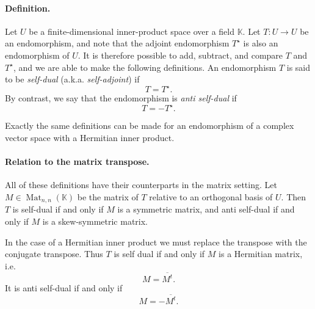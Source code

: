 \documentclass[12pt]{article}
\newcommand{\Mat}{\mathop{\mathrm{Mat}}\nolimits}
\newcommand{\kfield}{\mathbb{K}}
\newcommand{\adj}{^{\displaystyle \star}}
\begin{document}
\paragraph{Definition.}  Let $U$ be a finite-dimensional inner-product space
over a field $\kfield$.  Let $T:U\rightarrow U$ be an endomorphism,
and note that the adjoint endomorphism $T\adj$ is also an endomorphism
of $U$.  It is therefore possible to add, subtract, and compare $T$
and $T\adj$, and we are able to make the following definitions. An
endomorphism $T$ is said to be {\em self-dual} (a.k.a.  {\em
  self-adjoint}) if
$$T=T\adj.$$
By contrast, we say that the endomorphism is {\em anti self-dual} if 
$$T=-T\adj.$$

Exactly the same definitions can be made for an endomorphism of
a complex vector space with a Hermitian inner product.

\paragraph{Relation to the matrix transpose.} All of these definitions have
their counterparts in the matrix setting.  Let $M\in
\Mat_{n,n}(\kfield)$ be the matrix of $T$ relative to an orthogonal
basis of $U$. Then $T$ is self-dual if and only if $M$ is a symmetric matrix,
and anti self-dual if and only if $M$ is a skew-symmetric matrix.

In the case of a Hermitian inner product we must replace the transpose
with the conjugate transpose. Thus $T$ is self dual if and only if $M$ is a Hermitian matrix, i.e.
$$M = \overline{M^t}.$$
It is anti self-dual if and only if
$$M = -\overline{M^t}.$$
\end{document}
